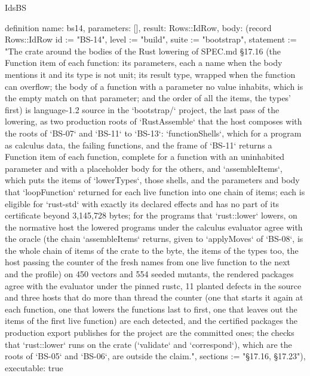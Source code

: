 \begin{lexlean}{IdsBS}
\begin{semanticmodule}
definition{
  name: bs14,
  parameters: [],
  result: Rows::IdRow,
  body: (record Rows::IdRow {id := "BS-14", level := "build", suite := "bootstrap", statement := "The crate around the bodies of the Rust lowering of SPEC.md §17.16 (the Function item of each function: its parameters, each a name when the body mentions it and its type is not unit; its result type, wrapped when the function can overflow; the body of a function with a parameter no value inhabits, which is the empty match on that parameter; and the order of all the items, the types' first) is language-1.2 source in the `bootstrap/` project, the last pass of the lowering, as two production roots of `RustAssemble` that the host composes with the roots of `BS-07` and `BS-11` to `BS-13`: `functionShells`, which for a program as calculus data, the failing functions, and the frame of `BS-11` returns a Function item of each function, complete for a function with an uninhabited parameter and with a placeholder body for the others, and `assembleItems`, which puts the items of `lowerTypes`, those shells, and the parameters and body that `loopFunction` returned for each live function into one chain of items; each is eligible for `rust-std` with exactly its declared effects and has no part of its certificate beyond 3,145,728 bytes; for the programs that `rust::lower` lowers, on the normative host the lowered programs under the calculus evaluator agree with the oracle (the chain `assembleItems` returns, given to `applyMoves` of `BS-08`, is the whole chain of items of the crate to the byte, the items of the types too, the host passing the counter of the fresh names from one live function to the next and the profile) on 450 vectors and 554 seeded mutants, the rendered packages agree with the evaluator under the pinned rustc, 11 planted defects in the source and three hosts that do more than thread the counter (one that starts it again at each function, one that lowers the functions last to first, one that leaves out the items of the first live function) are each detected, and the certified packages the production export publishes for the project are the committed ones; the checks that `rust::lower` runs on the crate (`validate` and `correspond`), which are the roots of `BS-05` and `BS-06`, are outside the claim.", sections := "§17.16, §17.23"}),
  executable: true
}


\end{semanticmodule}
\end{lexlean}
